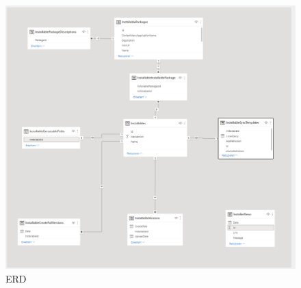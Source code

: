 \begin{figure}
  \centering
  \includegraphics[width=.94\textwidth]{pics/erd.png}
  \caption{\label{fig:The-caption} ERD}
\end{figure}

